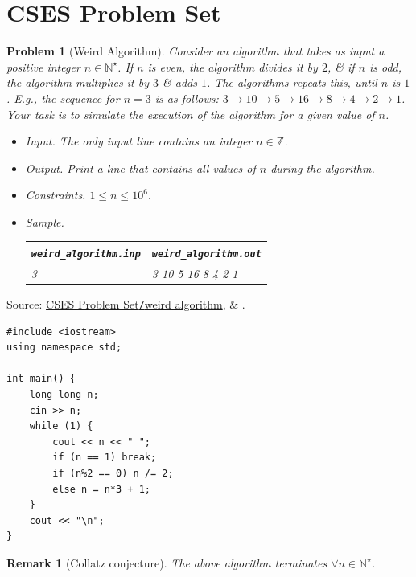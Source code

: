 \documentclass{article}
\newtheorem{problem}{Problem}
\newtheorem{remark}{Remark}
\begin{document}
\section{CSES Problem Set}

\begin{problem}[Weird Algorithm]
	Consider an algorithm that takes as input a positive integer $n\in\mathbb{N}^\star$. If $n$ is even, the algorithm divides it by $2$, \& if $n$ is odd, the algorithm multiplies it by $3$ \& adds $1$. The algorithms repeats this, until $n$ is $1$. E.g., the sequence for $n = 3$ is as follows: $3\to10\to5\to16\to8\to4\to2\to1$. Your task is to simulate the execution of the algorithm for a given value of $n$.
	\begin{itemize}
		\item {\sf Input.} The only input line contains an integer $n\in\mathbb{Z}$.
		\item {\sf Output.} Print a line that contains all values of $n$ during the algorithm.
		\item {\sf Constraints.} $1\le n\le10^6$.
		\item {\sf Sample.}
		\begin{table}[H]
			\centering
			\begin{tabular}{|l|l|}
				\hline
				\verb|weird_algorithm.inp| & \verb|weird_algorithm.out| \\
				\hline
				3 & 3 10 5 16 8 4 2 1 \\
				\hline
			\end{tabular}
		\end{table}
	\end{itemize}
\end{problem}
Source: \href{https://cses.fi/problemset/task/1068}{CSES Problem Set\texttt{/}weird algorithm}, \& \cite[Sect. 1.3, pp. 5--7]{Laaksonen2020}.

\begin{verbatim}
#include <iostream>
using namespace std;

int main() {
    long long n;
    cin >> n;
    while (1) {
        cout << n << " ";
        if (n == 1) break;
        if (n%2 == 0) n /= 2;
        else n = n*3 + 1;
    }
    cout << "\n";
}
\end{verbatim}

\begin{remark}[Collatz conjecture]
	The above algorithm terminates $\forall n\in\mathbb{N}^\star$.
\end{remark}
\end{document}
